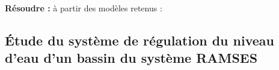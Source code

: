 \documentclass[10pt]{article}
\begin{document}






\begin{comp}
\noindent \textbf{Résoudre :} à partir des modèles retenus :


\end{comp}


\setcounter{subparagraph}{0}

\subsection*{Étude du système de régulation du niveau d'eau d'un bassin du système RAMSES}
\end{document}
